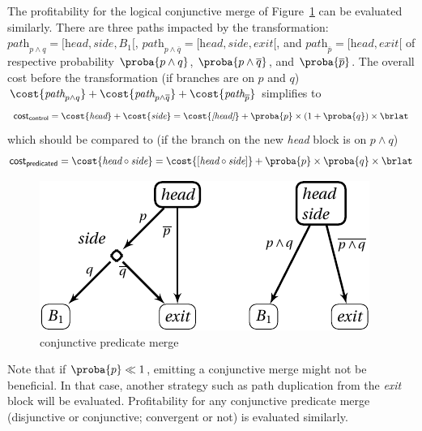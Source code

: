 The profitability for the logical conjunctive merge of Figure~\ref{fig:paths_convergent} can be evaluated similarly. There are three paths impacted by the transformation: $\textit{path}_{p\wedge q}=[\textit{head}, \textit{side}, B_1[$, $\textit{path}_{p\wedge \overline{q}}=[\textit{head}, \textit{side}, \textit{exit}[$, and $\textit{path}_{\overline{p}}=[\textit{head}, \textit{exit}[$ of respective probability  $\proba{p\wedge q}$, $\proba{p\wedge \overline{q}}$, and $\proba{\overline{p}}$. The overall cost before the transformation (if branches are on $p$ and $q$) $\cost{\textit{path}_{p\wedge q}}+\cost{\textit{path}_{p\wedge \overline{q}}}+\cost{\textit{path}_{\overline{p}}}$ simplifies to
$$\textsf{cost}_{\textsf{control}}=\cost{\textit{head}}+\cost{\textit{side}}=\cost{\textit{[head]}}+\proba{p}\times (1+\proba{q})\times\brlat$$
which should be compared to (if the branch on the new \textit{head} block is on $p \wedge q$)
$$\textsf{cost}_{\textsf{predicated}}=\cost{\textit{head}\circ \textit{side}}=\cost{[\textit{head}\circ \textit{side}]}+\proba{p}\times\proba{q}\times \brlat$$
\begin{figure}[h]
  \includegraphics[scale=0.7]{paths_convergent.pdf}
  \caption{conjunctive predicate merge\label{fig:paths_convergent}}
\end{figure}

Note that if $\proba{p}\ll 1$, emitting a conjunctive merge might not be beneficial. In that case, another strategy such as path duplication from the \textit{exit} block will be evaluated. Profitability for any conjunctive predicate merge (disjunctive or conjunctive; convergent or not) is evaluated similarly.


